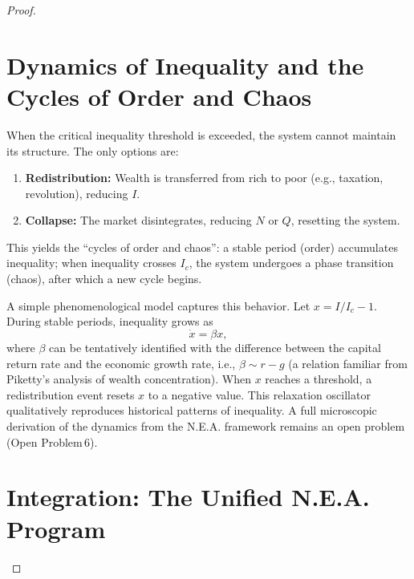 \documentclass{article}
\begin{document}
\begin{proof}
\section{Dynamics of Inequality and the Cycles of Order and Chaos}
When the critical inequality threshold is exceeded, the system cannot maintain its structure. The only options are:
\begin{enumerate}
    \item \textbf{Redistribution:} Wealth is transferred from rich to poor (e.g., taxation, revolution), reducing $I$.
    \item \textbf{Collapse:} The market disintegrates, reducing $N$ or $Q$, resetting the system.
\end{enumerate}
This yields the “cycles of order and chaos”: a stable period (order) accumulates inequality; when inequality crosses $I_c$, the system undergoes a phase transition (chaos), after which a new cycle begins.

A simple phenomenological model captures this behavior. Let $x = I/I_c - 1$. During stable periods, inequality grows as
\[
\dot{x} = \beta x,
\]
where $\beta$ can be tentatively identified with the difference between the capital return rate and the economic growth rate, i.e., $\beta \sim r - g$ (a relation familiar from Piketty’s analysis of wealth concentration). When $x$ reaches a threshold, a redistribution event resets $x$ to a negative value. This relaxation oscillator qualitatively reproduces historical patterns of inequality. A full microscopic derivation of the dynamics from the N.E.A. framework remains an open problem (Open Problem 6).

\section{Integration: The Unified N.E.A. Program}

\end{proof}
\end{document}
